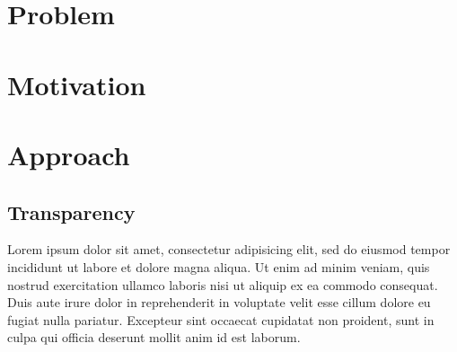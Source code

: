 \documentclass[a0,landscape]{a0poster}
\begin{document}
\begin{multicols}{3}
\color{Black}
\section*{Problem}






\section*{Motivation}




\vfill\null
\columnbreak




\section*{Approach}


\color{MidnightBlue}
\subsection*{Transparency}
\color{Black}

% 
Lorem ipsum dolor sit amet, consectetur adipisicing elit, sed do eiusmod
tempor incididunt ut labore et dolore magna aliqua. Ut enim ad minim veniam,
quis nostrud exercitation ullamco laboris nisi ut aliquip ex ea commodo
consequat. Duis aute irure dolor in reprehenderit in voluptate velit esse
cillum dolore eu fugiat nulla pariatur. Excepteur sint occaecat cupidatat non
proident, sunt in culpa qui officia deserunt mollit anim id est laborum.


\end{multicols}
\end{document}
